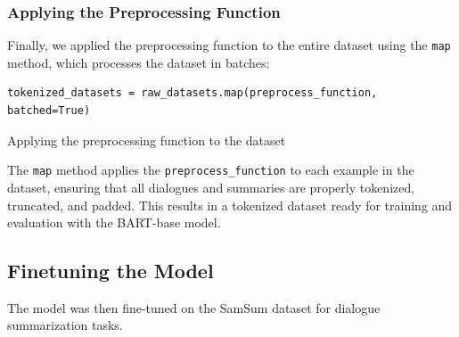 \subsubsection{Applying the Preprocessing Function}

Finally, we applied the preprocessing function to the entire dataset using the \texttt{map} method, which processes the dataset in batches:

\begin{listing}[H]
\begin{verbatim}
tokenized_datasets = raw_datasets.map(preprocess_function, batched=True)
\end{verbatim}
\caption{Applying the preprocessing function to the dataset}
\label{listing:Tokenized_Datasets}
\end{listing}

The \texttt{map} method applies the \texttt{preprocess\_function} to each example in the dataset, ensuring that all dialogues and summaries are properly tokenized, truncated, and padded. This results in a tokenized dataset ready for training and evaluation with the BART-base model.

    \subsection{Finetuning the Model}
        The model was then fine-tuned on the SamSum dataset for dialogue summarization tasks.
        \begin{table}[h!]
            \centering
            \caption{Training and validation results across epochs.}
            \label{tab:training_results}
        \end{table}
